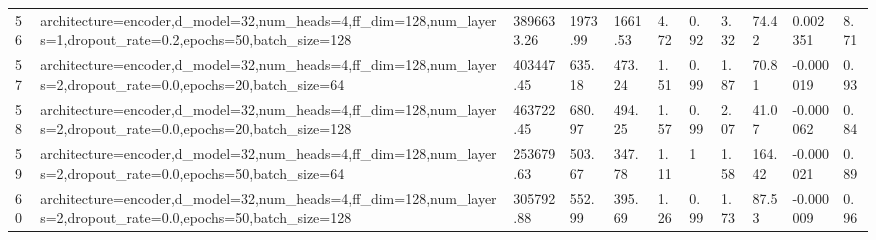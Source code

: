 \begin{longtable}{C{0.8cm} L{2cm} C{1.15cm} C{1.15cm} C{1.15cm} C{1.15cm} C{0.85cm} C{1.25cm} C{1.2cm} C{1.5cm} C{1.0cm}}
56 & architecture=encoder,\newline d\_model=32,\newline num\_heads=4,\newline ff\_dim=128,\newline num\_layers=1,\newline dropout\_rate=0.2,\newline epochs=50,\newline batch\_size=128 & 3896633.26 & 1973.99 & 1661.53 & 4.72 & 0.92 & 3.32 & 74.42 & 0.002351 & 8.71 \\
57 & architecture=encoder,\newline d\_model=32,\newline num\_heads=4,\newline ff\_dim=128,\newline num\_layers=2,\newline dropout\_rate=0.0,\newline epochs=20,\newline batch\_size=64 & 403447.45 & 635.18 & 473.24 & 1.51 & 0.99 & 1.87 & 70.81 & -0.000019 & 0.93 \\
58 & architecture=encoder,\newline d\_model=32,\newline num\_heads=4,\newline ff\_dim=128,\newline num\_layers=2,\newline dropout\_rate=0.0,\newline epochs=20,\newline batch\_size=128 & 463722.45 & 680.97 & 494.25 & 1.57 & 0.99 & 2.07 & 41.07 & -0.000062 & 0.84 \\
59 & architecture=encoder,\newline d\_model=32,\newline num\_heads=4,\newline ff\_dim=128,\newline num\_layers=2,\newline dropout\_rate=0.0,\newline epochs=50,\newline batch\_size=64 & 253679.63 & 503.67 & 347.78 & 1.11 & 1 & 1.58 & 164.42 & -0.000021 & 0.89 \\
60 & architecture=encoder,\newline d\_model=32,\newline num\_heads=4,\newline ff\_dim=128,\newline num\_layers=2,\newline dropout\_rate=0.0,\newline epochs=50,\newline batch\_size=128 & 305792.88 & 552.99 & 395.69 & 1.26 & 0.99 & 1.73 & 87.53 & -0.000009 & 0.96 \\

\end{longtable}
